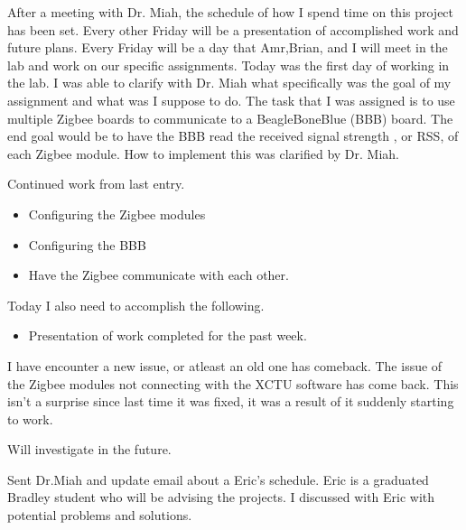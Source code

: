 \documentclass[fontsize=11pt, %
                             paper=letter, %
                             twoside, %
                             captions=tableheading,
                             index=totoc,
                             hyperref]{labbook}
\begin{document}
\begin{addmargin}[0cm]{0cm}
After a meeting with Dr. Miah, the schedule of how I spend time on this project has been set. Every other Friday will be a presentation of accomplished work and future plans. Every Friday will be a day that Amr,Brian, and I will meet in the lab and work on our specific assignments. Today was the first day of working in the lab. I was able to clarify with Dr. Miah what specifically was the goal of my assignment and what was I suppose to do. 
\bigbreak\noindent
The task that I was assigned is to use multiple Zigbee boards to communicate to a BeagleBoneBlue (BBB) board. The end goal would be to have the BBB read the received signal strength , or RSS, of each Zigbee module. How to implement this was clarified by Dr. Miah.

Continued work from last entry.
\begin{itemize}
\item Configuring the Zigbee modules
\item Configuring the BBB 
\item Have the Zigbee communicate with each other.
\end{itemize}

Today I also need to accomplish the following.

\begin{itemize}
\item Presentation of work completed for the past week.
\end{itemize}
I have encounter a new issue, or atleast an old one has comeback. The issue of the Zigbee modules not connecting with the XCTU software has come back. This isn't a surprise since last time it was fixed, it was a result of it suddenly starting to work. 

Will investigate in the future.

Sent Dr.Miah and update email about a Eric's schedule. Eric is a graduated Bradley student who will be advising the projects. I discussed with Eric with potential problems and solutions.


\end{addmargin}
\end{document}
